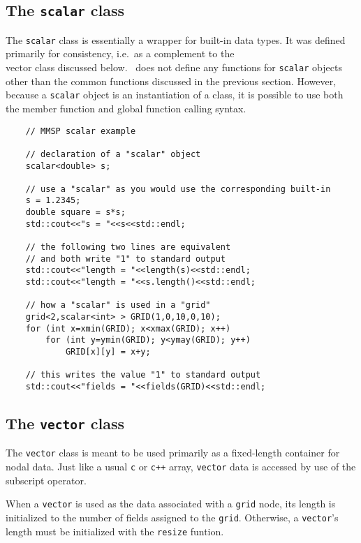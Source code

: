 \subsection{The {\tt scalar} class}
The {\tt scalar} class is essentially a wrapper for built-in data types.  It was defined primarily for consistency, i.e.\ as a complement to the {\\ vector} class discussed below.  \MMSP\ does not define any functions for {\tt scalar} objects other than the common functions discussed in the previous section.  However, because a {\tt scalar} object is an instantiation of a class, it is possible to use both the member function and global function calling syntax.
\begin{shadebox}
\begin{verbatim}
    // MMSP scalar example

    // declaration of a "scalar" object
    scalar<double> s;

    // use a "scalar" as you would use the corresponding built-in
    s = 1.2345;
    double square = s*s;
    std::cout<<"s = "<<s<<std::endl;

    // the following two lines are equivalent
    // and both write "1" to standard output
    std::cout<<"length = "<<length(s)<<std::endl;
    std::cout<<"length = "<<s.length()<<std::endl;

    // how a "scalar" is used in a "grid"
    grid<2,scalar<int> > GRID(1,0,10,0,10);
    for (int x=xmin(GRID); x<xmax(GRID); x++)
        for (int y=ymin(GRID); y<ymay(GRID); y++)
            GRID[x][y] = x+y;

    // this writes the value "1" to standard output
    std::cout<<"fields = "<<fields(GRID)<<std::endl;
\end{verbatim}
\end{shadebox}
\subsection{The {\tt vector} class}
The {\tt vector} class is meant to be used primarily as a fixed-length container for nodal data.  Just like a usual {\tt c} or {\tt c++} array, {\tt vector} data is accessed by use of the subscript operator.

When a {\tt vector} is used as the data associated with a {\tt grid} node, its length is initialized to the number of fields assigned to the {\tt grid}.  Otherwise, a {\tt vector}'s length must be initialized with the {\tt resize} funtion.

